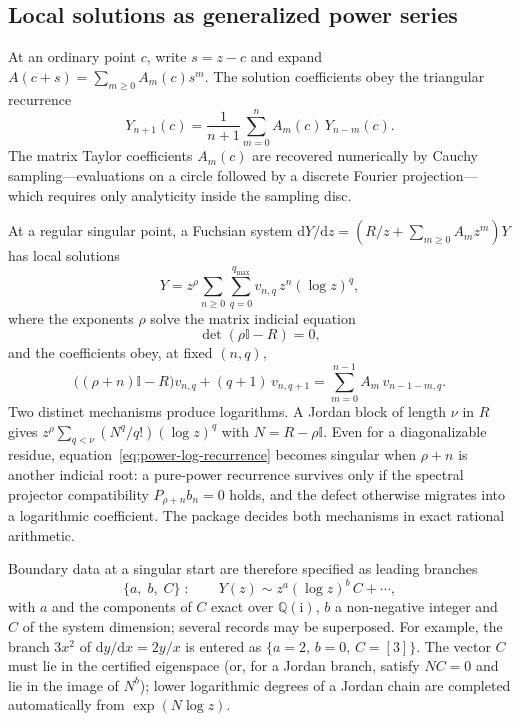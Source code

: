 \documentclass[11pt,a4paper]{article}
\newcommand{\dd}{\mathrm d}
\newcommand{\ii}{\mathrm i}
\newcommand{\Id}{\mathbb I}
\begin{document}
\subsection{Local solutions as generalized power series}
\label{sec:local-solutions}

At an ordinary point $c$, write $s=z-c$ and expand $A(c+s)=\sum_{m\ge0}A_m(c)s^m$. The
solution coefficients obey the triangular recurrence
\begin{equation}
  Y_{n+1}(c)=\frac{1}{n+1}\sum_{m=0}^{n}A_m(c)\,Y_{n-m}(c).
  \label{eq:ordinary-recurrence}
\end{equation}
The matrix Taylor coefficients $A_m(c)$ are recovered numerically by Cauchy
sampling---evaluations on a circle followed by a discrete Fourier projection---which
requires only analyticity inside the sampling disc.

At a regular singular point, a Fuchsian system
$\dd Y/\dd z=(R/z+\sum_{m\ge0}A_mz^m)Y$ has local solutions
\begin{equation}
  Y=z^\rho\sum_{n\ge0}\sum_{q=0}^{q_{\max}}v_{n,q}\,z^n(\log z)^q,
  \label{eq:power-log-form}
\end{equation}
where the exponents $\rho$ solve the matrix indicial equation
\begin{equation}
  \det(\rho\Id-R)=0,
  \label{eq:matrix-indicial}
\end{equation}
and the coefficients obey, at fixed $(n,q)$,
\begin{equation}
  \bigl((\rho+n)\Id-R\bigr)v_{n,q}+(q+1)\,v_{n,q+1}
  =\sum_{m=0}^{n-1}A_m\,v_{n-1-m,q}.
  \label{eq:power-log-recurrence}
\end{equation}
Two distinct mechanisms produce logarithms. A Jordan block of length $\nu$ in $R$ gives
$z^\rho\sum_{q<\nu}(N^q/q!)(\log z)^q$ with $N=R-\rho\Id$. Even for a diagonalizable
residue, equation~\eqref{eq:power-log-recurrence} becomes singular when $\rho+n$ is
another indicial root: a pure-power recurrence survives only if the spectral projector
compatibility $P_{\rho+n}b_n=0$ holds, and the defect otherwise migrates into a
logarithmic coefficient. The package decides both mechanisms in exact rational arithmetic.

Boundary data at a singular start are therefore specified as leading branches
\begin{equation}
  \{a,\;b,\;C\}\;:\qquad Y(z)\sim z^{a}(\log z)^{b}\,C+\cdots,
  \label{eq:frobenius-boundary-record}
\end{equation}
with $a$ and the components of $C$ exact over $\mathbb Q(\ii)$, $b$ a non-negative integer
and $C$ of the system dimension; several records may be superposed. For example, the
branch $3x^{2}$ of $\dd y/\dd x=2y/x$ is entered as $\{a{=}2,\,b{=}0,\,C{=}[3]\}$. The
vector $C$ must lie
in the certified eigenspace (or, for a Jordan branch, satisfy $NC=0$ and lie in the image
of $N^b$); lower logarithmic degrees of a Jordan chain are completed automatically from
$\exp(N\log z)$.
\end{document}
